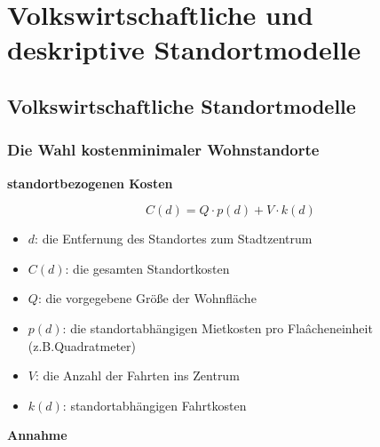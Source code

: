 \chapter{Volkswirtschaftliche und deskriptive Standortmodelle} %
\label{cha:volkswirtschaftliche_und_deskriptive_standortmodelle}

  \section{Volkswirtschaftliche Standortmodelle} %
  \label{sec:volkswirtschaftliche_standortmodelle}

    \subsection{Die Wahl kostenminimaler Wohnstandorte} %
    \label{sub:die_Wahl_kostenminimaler_Wohnstandorte}
    
      \par \textbf{standortbezogenen Kosten}

      \begin{equation}
        C(d) = Q\cdot p(d) + V\cdot k(d)
        \label{standortbezogenen Kosten}
      \end{equation}

        \begin{itemize}
          \item $d$: die Entfernung des Standortes zum Stadtzentrum
          \item $C(d)$: die gesamten Standortkosten
          \item $Q$: die vorgegebene Größe der Wohnfläche
          \item $p(d)$: die standortabhängigen Mietkosten pro Flaâcheneinheit (z.B.Quadratmeter)
          \item $V$: die Anzahl der Fahrten ins Zentrum
          \item $k(d)$: standortabhängigen Fahrtkosten
        \end{itemize}

      \par \textbf{Annahme}

